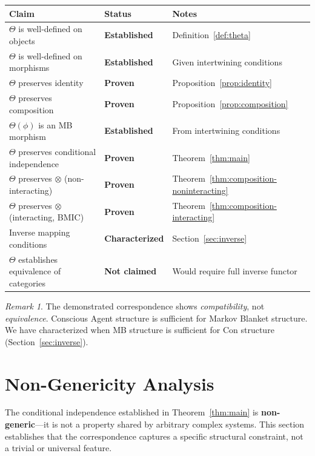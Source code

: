 \documentclass[11pt,a4paper]{article}
\theoremstyle{definition}
\theoremstyle{plain}
\theoremstyle{remark}
\newtheorem{remark}[definition]{Remark}
\begin{document}
\begin{center}
\begin{tabular}{lll}
\toprule
\textbf{Claim} & \textbf{Status} & \textbf{Notes} \\
\midrule
$\Theta$ is well-defined on objects & \textbf{Established} & Definition~\ref{def:theta} \\
$\Theta$ is well-defined on morphisms & \textbf{Established} & Given intertwining conditions \\
$\Theta$ preserves identity & \textbf{Proven} & Proposition~\ref{prop:identity} \\
$\Theta$ preserves composition & \textbf{Proven} & Proposition~\ref{prop:composition} \\
$\Theta(\phi)$ is an MB morphism & \textbf{Established} & From intertwining conditions \\
$\Theta$ preserves conditional independence & \textbf{Proven} & Theorem~\ref{thm:main} \\
$\Theta$ preserves $\otimes$ (non-interacting) & \textbf{Proven} & Theorem~\ref{thm:composition-noninteracting} \\
$\Theta$ preserves $\otimes$ (interacting, BMIC) & \textbf{Proven} & Theorem~\ref{thm:composition-interacting} \\
Inverse mapping conditions & \textbf{Characterized} & Section~\ref{sec:inverse} \\
$\Theta$ establishes equivalence of categories & \textbf{Not claimed} & Would require full inverse functor \\
\bottomrule
\end{tabular}
\end{center}

\begin{remark}
The demonstrated correspondence shows \emph{compatibility}, not \emph{equivalence}. Conscious Agent structure is sufficient for Markov Blanket structure. We have characterized when MB structure is sufficient for Con structure (Section~\ref{sec:inverse}).
\end{remark}

\section{Non-Genericity Analysis}

The conditional independence established in Theorem~\ref{thm:main} is \textbf{non-generic}---it is not a property shared by arbitrary complex systems. This section establishes that the correspondence captures a specific structural constraint, not a trivial or universal feature.
\end{document}
